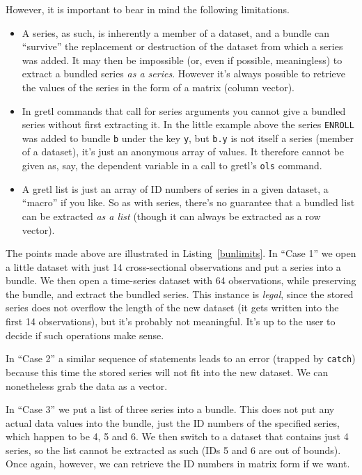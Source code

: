 However, it is important to bear in mind the following limitations.
\begin{itemize}
\item A series, as such, is inherently a member of a dataset, and a
  bundle can ``survive'' the replacement or destruction of the dataset
  from which a series was added. It may then be impossible (or, even
  if possible, meaningless) to extract a bundled series \textit{as a
    series}. However it's always possible to retrieve the values of
  the series in the form of a matrix (column vector).
\item In gretl commands that call for series arguments you cannot give
  a bundled series without first extracting it. In the little example
  above the series \texttt{ENROLL} was added to bundle \texttt{b}
  under the key \texttt{y}, but \texttt{b.y} is not itself a series
  (member of a dataset), it's just an anonymous array of values. It
  therefore cannot be given as, say, the dependent variable in a call
  to gretl's \texttt{ols} command.
\item A gretl list is just an array of ID numbers of series in a given
  dataset, a ``macro'' if you like. So as with series, there's no
  guarantee that a bundled list can be extracted \textit{as a list}
  (though it can always be extracted as a row vector).
\end{itemize}

The points made above are illustrated in Listing~\ref{bunlimits}.  In
``Case 1'' we open a little dataset with just 14 cross-sectional
observations and put a series into a bundle. We then open a
time-series dataset with 64 observations, while preserving the bundle,
and extract the bundled series. This instance is \textit{legal}, since
the stored series does not overflow the length of the new dataset (it
gets written into the first 14 observations), but it's probably not
meaningful. It's up to the user to decide if such operations make
sense.

In ``Case 2'' a similar sequence of statements leads to an error
(trapped by \texttt{catch}) because this time the stored series will
not fit into the new dataset. We can nonetheless grab the data as a
vector.

In ``Case 3'' we put a list of three series into a bundle. This does
not put any actual data values into the bundle, just the ID numbers of
the specified series, which happen to be 4, 5 and 6. We then switch to
a dataset that contains just 4 series, so the list cannot be extracted
as such (IDs 5 and 6 are out of bounds). Once again, however, we can
retrieve the ID numbers in matrix form if we want.

